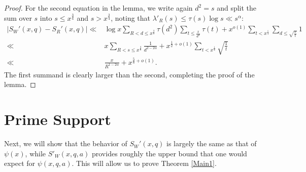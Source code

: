 \documentclass{amsart}
\begin{document}
\begin{proof}
For the second equation in the lemma, we write again $d^2=s$ and split the sum over $s$ into $s\leq x^\frac 34$ and $s>x^\frac 34$, noting that $\lambda'_R(s)\leq \tau(s)\log s\ll s^\alpha$:
\begin{align*}\left|S_W'(x,q)-S_R'(x,q)\right|\ll &\log x\sum_{R<d\leq x^\frac 38}\tau\left(d^2\right)\sum_{t\leq \frac x{d^2} }\tau(t)+x^{o(1)}\sum_{t<x^\frac 14}\sum_{d\leq \sqrt{\frac xt} }1\\
\ll &x\sum_{R<s\leq x^\frac 38}\frac{1}{d^{2-2\alpha}}+x^{\frac 12+o(1)}\sum_{t<x^\frac 14}\sqrt{\frac 1t}\\
\ll &\frac{x}{R^{1-2\alpha}}+x^{\frac 58+o(1)}.
\end{align*}
The first summand is clearly larger than the second, completing the proof of the lemma.
\end{proof}

\section{Prime Support}\label{final}

Next, we will show that the behavior of $S_W'(x,q)$ is largely the same as that of $\psi(x)$, while $S'_W(x,q,a)$ provides roughly the upper bound that one would expect for $\psi(x,q,a)$.  This will allow us to prove Theorem \ref{Main1}.

\end{document}
